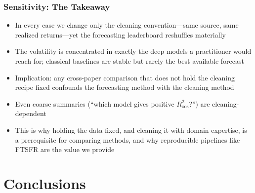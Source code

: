 \documentclass[ignorenonframetext, 9pt]{beamer}
\begin{document}
\begin{frame}
  \frametitle{Sensitivity: The Takeaway}
  \begin{itemize}
  \item In every case we change \alert{only the cleaning convention}---same source, same realized returns---yet the forecasting leaderboard \alert{reshuffles materially}
  \vspace{0.3cm}
  \item The volatility is concentrated in exactly the \alert{deep models a practitioner would reach for}; classical baselines are stable but rarely the best available forecast
  \vspace{0.3cm}
  \item \alert{Implication:} any cross-paper comparison that does not hold the cleaning recipe fixed \alert{confounds the forecasting method with the cleaning method}
  \vspace{0.3cm}
  \item Even coarse summaries (``which model gives positive $R^2_{\text{oos}}$?'') are cleaning-dependent
  \vspace{0.3cm}
  \item \alert{This is why holding the data fixed, and cleaning it with domain expertise, is a prerequisite for comparing methods}, and why reproducible pipelines like FTSFR are the value we provide
  \end{itemize}
\end{frame}

\section{Conclusions}
\end{document}
